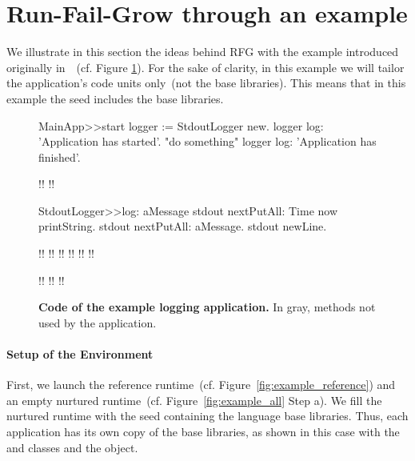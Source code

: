 

\section{Run-Fail-Grow through an example}\label{sec:rfg_example}
We illustrate in this section the ideas behind RFG with the example introduced originally in~~(cf. Figure \ref{fig:code_example_again}). For the sake of clarity, in this example we will tailor the application's code units only~(\ie not the base libraries). This means that in this example the seed includes the base libraries.

\begin{figure}[ht]
\begin{code}
MainApp>>start
    logger := StdoutLogger new.
    logger log: 'Application has started'.
    "do something"
    logger log: 'Application has finished'.

!!
!!

StdoutLogger>>log: aMessage
    stdout nextPutAll: Time now printString.
    stdout nextPutAll: aMessage.
    stdout newLine.
    
!!
!!
!!
!!
!!
!!

!!
!!
!!
\end{code}

\caption{\textbf{Code of the example logging application.} In gray, methods not used by the application.\label{fig:code_example_again}}
\end{figure}


\paragraph{Setup of the Environment} First, we launch the reference runtime~(cf. Figure~\ref{fig:example_reference}) and an empty nurtured runtime~(cf. Figure~\ref{fig:example_all} Step a). We fill the nurtured runtime with the seed containing the language base libraries. Thus, each application has its own copy of the base libraries, as shown in this case with the  and  classes and the  object.

